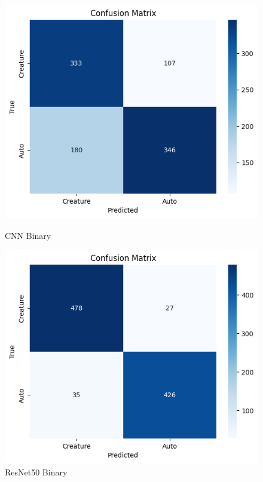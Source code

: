 \documentclass{article} %
\begin{document}
\begin{figure}[htbp]
  \centering
  \begin{minipage}{.3\textwidth}
    \centering
    \includegraphics[width=\linewidth]{./figure+object/cnn_binary_bce.png}
    \caption{CNN Binary}
    \label{fig:cnn_cm_bin}
  \end{minipage}%
  \hfill
  \begin{minipage}{.3\textwidth}
    \centering
    \includegraphics[width=\linewidth]{./figure+object/resnet_binary_bce.png}
    \caption{ResNet50 Binary}

\end{minipage}
\end{figure}
\end{document}

